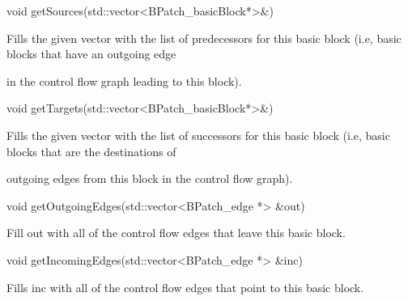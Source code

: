 \label{bkm:Ref161214701}





\bigskip



{

void getSources(std::vector<BPatch_basicBlock*>&)}



{

Fills the given vector with the list of predecessors for this basic block (i.e, basic blocks that have an outgoing edge

in the control flow graph leading to this block).}



{

void getTargets(std::vector<BPatch_basicBlock*>&)}



{

Fills the given vector with the list of successors for this basic block (i.e, basic blocks that are the destinations of

outgoing edges from this block in the control flow graph).}



{

void getOutgoingEdges(std::vector<BPatch_edge *> &out)}



{

Fill out with all of the control flow edges that leave this basic block.}



{

void getIncomingEdges(std::vector<BPatch_edge *> &inc)}



{

Fills inc with all of the control flow edges that point to this basic block.}



